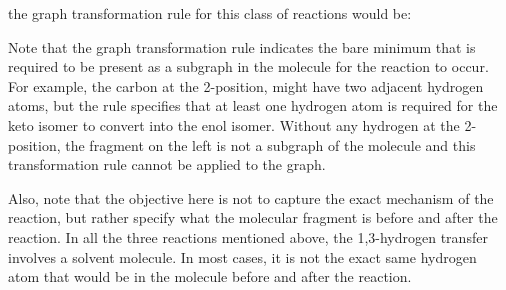\noindent the graph transformation rule for this class of reactions would be:
\begin{center}
\end{center}
Note that the graph transformation rule indicates the bare minimum that is required to be present as a subgraph in the molecule for the reaction to occur. For example, the carbon at the 2-position, might have two adjacent hydrogen atoms, but the rule specifies that at least one hydrogen atom is required for the keto isomer to convert into the enol isomer. Without any hydrogen at the 2-position, the fragment on the left is not a subgraph of the molecule and this transformation rule cannot be applied to the graph.

Also, note that the objective here is not to capture the exact mechanism of the reaction, but rather specify what the molecular fragment is before and after the reaction. In all the three reactions mentioned above, the 1,3-hydrogen transfer involves a solvent molecule. In most cases, it is not the exact same hydrogen atom that would be in the molecule before and after the reaction.

